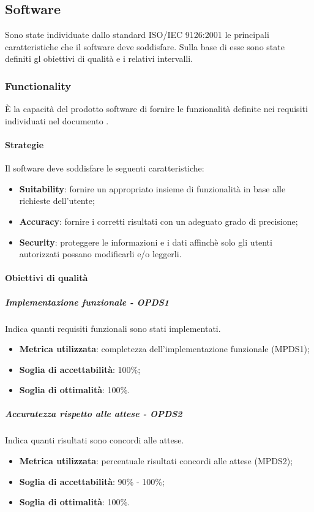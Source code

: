\documentclass[PianoDiQualifica.tex]{subfiles}
\begin{document}
	\subsection{Software}
		Sono state individuate dallo standard ISO/IEC 9126:2001 le principali caratteristiche che il software deve soddisfare.
		Sulla base di esse sono state definiti gl obiettivi di qualità e i relativi intervalli.
		
		\subsubsection{Functionality}
		È la capacità del prodotto software di fornire le funzionalità definite nei requisiti individuati nel documento \ARdocRP{}.
		
			\paragraph{Strategie}
			Il software deve soddisfare le seguenti caratteristiche:
			\begin{itemize}
				\item \textbf{Suitability}: fornire un appropriato insieme di funzionalità in base alle richieste dell'utente;
				\item \textbf{Accuracy}: fornire i corretti risultati con un adeguato grado di precisione;
				\item \textbf{Security}: proteggere le informazioni e i dati affinchè solo gli utenti autorizzati possano modificarli e/o leggerli.
			\end{itemize}
			
			\paragraph{Obiettivi di qualità}
				\subparagraph{Implementazione funzionale - OPDS1}
				Indica quanti requisiti funzionali sono stati implementati.
				\begin{itemize}
					\item \textbf{Metrica utilizzata}: completezza dell'implementazione funzionale (MPDS1);
					\item \textbf{Soglia di accettabilità}: 100\%;
					\item \textbf{Soglia di ottimalità}: 100\%.
				\end{itemize}
				
				\subparagraph{Accuratezza rispetto alle attese - OPDS2}
				Indica quanti risultati sono concordi alle attese.
				\begin{itemize}
					\item \textbf{Metrica utilizzata}: percentuale risultati concordi alle attese (MPDS2);
					\item \textbf{Soglia di accettabilità}: 90\% - 100\%;
					\item \textbf{Soglia di ottimalità}: 100\%.
				\end{itemize}
				
\end{document}
